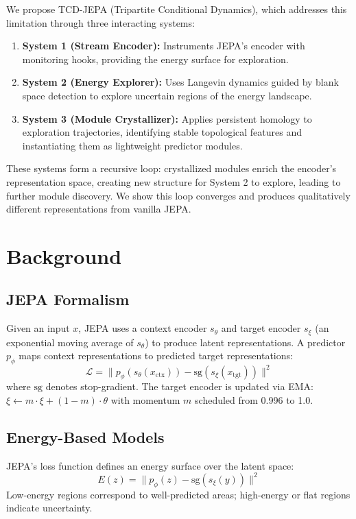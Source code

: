 \documentclass[10pt,twocolumn]{article}
\begin{document}
We propose TCD-JEPA (Tripartite Conditional Dynamics), which addresses this limitation through three interacting systems:
\begin{enumerate}
    \item \textbf{System 1 (Stream Encoder):} Instruments JEPA's encoder with monitoring hooks, providing the energy surface for exploration.
    \item \textbf{System 2 (Energy Explorer):} Uses Langevin dynamics guided by blank space detection to explore uncertain regions of the energy landscape.
    \item \textbf{System 3 (Module Crystallizer):} Applies persistent homology to exploration trajectories, identifying stable topological features and instantiating them as lightweight predictor modules.
\end{enumerate}

These systems form a recursive loop: crystallized modules enrich the encoder's representation space, creating new structure for System 2 to explore, leading to further module discovery. We show this loop converges and produces qualitatively different representations from vanilla JEPA.

\section{Background}

\subsection{JEPA Formalism}

Given an input $x$, JEPA uses a context encoder $s_\theta$ and target encoder $s_\xi$ (an exponential moving average of $s_\theta$) to produce latent representations. A predictor $p_\phi$ maps context representations to predicted target representations:
\begin{equation}
    \mathcal{L} = \|p_\phi(s_\theta(x_{\text{ctx}})) - \text{sg}(s_\xi(x_{\text{tgt}}))\|^2
\end{equation}
where $\text{sg}$ denotes stop-gradient. The target encoder is updated via EMA: $\xi \leftarrow m \cdot \xi + (1-m) \cdot \theta$ with momentum $m$ scheduled from 0.996 to 1.0.

\subsection{Energy-Based Models}

JEPA's loss function defines an energy surface over the latent space:
\begin{equation}
    E(z) = \|p_\phi(z) - \text{sg}(s_\xi(y))\|^2
\end{equation}
Low-energy regions correspond to well-predicted areas; high-energy or flat regions indicate uncertainty.
\end{document}
